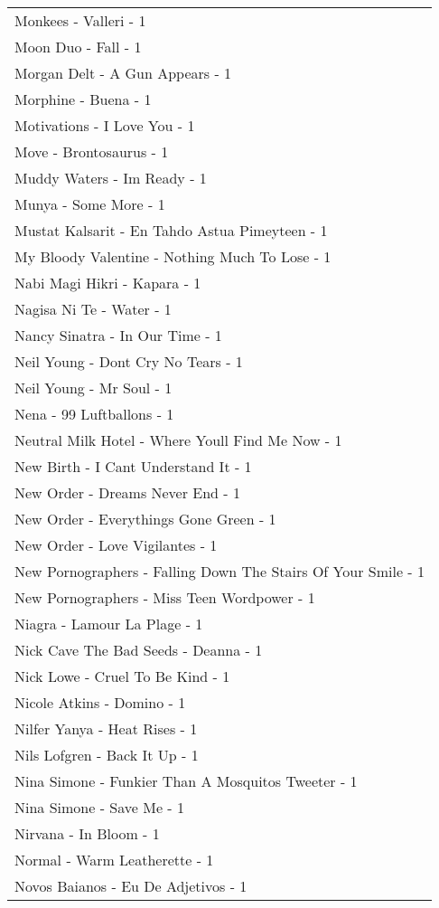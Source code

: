 \documentclass[
]{article}
\begin{document}
\begin{longtable}{l}
Monkees - Valleri - 1 \\ 
Moon Duo - Fall - 1 \\ 
Morgan Delt - A Gun Appears - 1 \\ 
Morphine - Buena - 1 \\ 
Motivations - I Love You - 1 \\ 
Move - Brontosaurus - 1 \\ 
Muddy Waters - Im Ready - 1 \\ 
Munya - Some More - 1 \\ 
Mustat Kalsarit - En Tahdo Astua Pimeyteen - 1 \\ 
My Bloody Valentine - Nothing Much To Lose - 1 \\ 
Nabi Magi Hikri - Kapara - 1 \\ 
Nagisa Ni Te - Water - 1 \\ 
Nancy Sinatra - In Our Time - 1 \\ 
Neil Young - Dont Cry No Tears - 1 \\ 
Neil Young - Mr Soul - 1 \\ 
Nena - 99 Luftballons - 1 \\ 
Neutral Milk Hotel - Where Youll Find Me Now - 1 \\ 
New Birth - I Cant Understand It - 1 \\ 
New Order - Dreams Never End - 1 \\ 
New Order - Everythings Gone Green - 1 \\ 
New Order - Love Vigilantes - 1 \\ 
New Pornographers - Falling Down The Stairs Of Your Smile - 1 \\ 
New Pornographers - Miss Teen Wordpower - 1 \\ 
Niagra - Lamour La Plage - 1 \\ 
Nick Cave The Bad Seeds - Deanna - 1 \\ 
Nick Lowe - Cruel To Be Kind - 1 \\ 
Nicole Atkins - Domino - 1 \\ 
Nilfer Yanya - Heat Rises - 1 \\ 
Nils Lofgren - Back It Up - 1 \\ 
Nina Simone - Funkier Than A Mosquitos Tweeter - 1 \\ 
Nina Simone - Save Me - 1 \\ 
Nirvana - In Bloom - 1 \\ 
Normal - Warm Leatherette - 1 \\ 
Novos Baianos - Eu De Adjetivos - 1 \\ 

\end{longtable}
\end{document}
